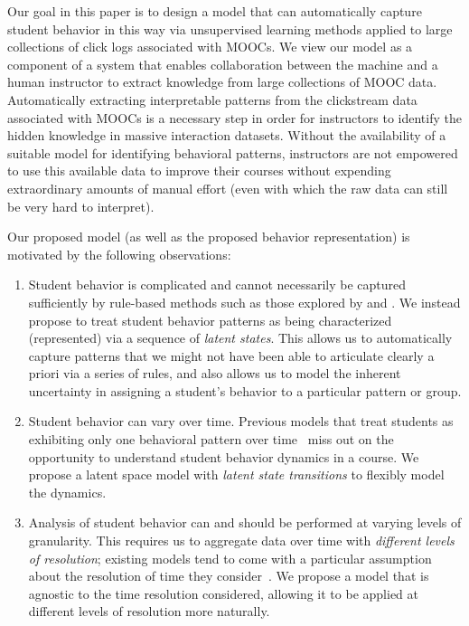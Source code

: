 Our goal in this paper is to design a model that can automatically capture
student behavior in this way via unsupervised learning methods applied to
large collections of click logs associated with MOOCs. We view our model
as a component of a system that enables collaboration between the machine
and a human instructor to extract knowledge from large collections of
MOOC data. Automatically extracting interpretable patterns from the
clickstream data associated with MOOCs is a necessary step in order for
instructors to identify the hidden knowledge in massive interaction
datasets. Without the availability of a suitable model for identifying
behavioral patterns, instructors are not empowered to use this available
data to improve their courses without expending extraordinary amounts of
manual effort (even with which the raw data can still be very hard to
interpret).

Our proposed model (as well as the proposed behavior representation) is
motivated by the following observations:
\begin{enumerate}
  \item Student behavior is complicated and cannot necessarily be captured
      sufficiently by rule-based methods such as those explored by
      \citet{Kizilcec:2013:LAK} and \citet{Davis:2016:EDM}. We instead
      propose to treat student behavior patterns as being characterized
      (represented) via a sequence of \emph{latent states}. This allows us
      to automatically capture patterns that we might not have been able to
      articulate clearly a priori via a series of rules, and also allows us
      to model the inherent uncertainty in assigning a student's behavior
      to a particular pattern or group.
  \item Student behavior can vary over time. Previous models that treat students
      as exhibiting only one behavioral pattern over
      time~\cite{Faucon:2016:EDM} miss out on the opportunity to understand
      student behavior dynamics in a course. We propose a latent space
      model with \emph{latent state transitions} to flexibly model the
      dynamics.
  \item Analysis of student behavior can and should be performed at varying
      levels of granularity. This requires us to aggregate data over time
      with \emph{different levels of resolution}; existing models tend to come
      with a particular assumption about the resolution of time they
      consider~\cite{Faucon:2016:EDM, Kizilcec:2013:LAK, Shih:2010:EDM}. We
      propose a model that is agnostic to the time resolution considered,
      allowing it to be applied at different levels of resolution more
      naturally.
\end{enumerate}

